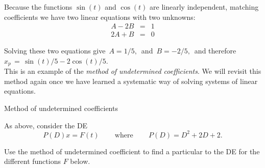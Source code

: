 Because the functions $\sin⁡ (t)$ and $\cos⁡ (t)$ are linearly independent,
matching coefficients we have two linear equations with two unknowns:
\begin{eqnarray*}
  A - 2B &=& 1 \\
  2A + B &=& 0 
\end{eqnarray*}

Solving these two equations give $\, A=1/5,\,$ and $\, B=-2/5,\,$
and therefore $x_ p\, =\,  \sin (t)/5-2\cos (t)/5$.\\

This is an example of the \emph{\color{blue}method of undetermined coefficients}.
We will revisit this method again once we have learned
a systematic way of solving systems of linear equations.

\begin{problem}
  Method of undetermined coefficients
\end{problem}

As above, consider the DE
\begin{equation*}
  P(D)x=F(t)\,  \qquad \text {where}\,  \qquad P(D)=D^2+2D+2.
\end{equation*}

Use the method of undetermined coefficient to find a particular to the DE
for the different functions $F$ below.

